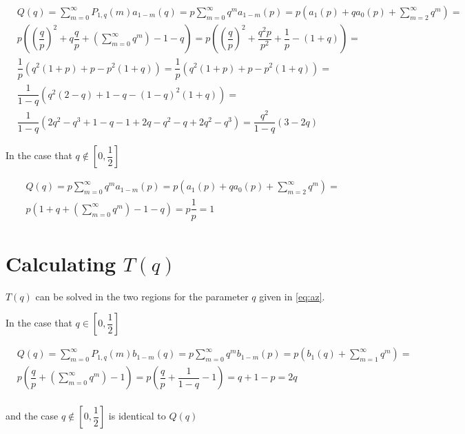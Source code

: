 \documentclass[letterpaper,12pt]{report}
\theoremstyle{plain}
\theoremstyle{definition}
\begin{document}
\begin{eqnarray}\label{eq:rpcalc}\nonumber
&\mathit{Q}(q)=\sum_{m=0}^{\infty}\mathit{P}_{1,q}(m)\mathit{a}_{1-m}(q)=p\sum_{m=0}^{\infty}q^m\mathit{a}_{1-m}(p)=p\left(
\mathit{a}_1(p)+q\mathit{a}_0(p)+\sum_{m=2}^{\infty}q^m
 \right)=\\\nonumber
 &p\left(
\left(\dfrac{q}{p}\right)^2+q\dfrac{q}{p}+\left(\sum_{m=0}^{\infty}q^m\right)-1-q
 \right) 
 =p\left(
\left(\dfrac{q}{p}\right)^2+\dfrac{q^2p}{p^2}+\dfrac{1}{p}-(1+q)
 \right)=\\\nonumber
&\dfrac{1}{p}\left(
q^2(1+p)+p-p^2(1+q)
\right) 
 =\dfrac{1}{p}
\left(q^2(1+p)+p-p^2(1+q)
 \right)=\\\nonumber
&\dfrac{1}{1-q}\left(
q^2(2-q)+1-q-(1-q)^2(1+q)
\right) 
 =\\\nonumber
 &\dfrac{1}{1-q}\left(
2q^2-q^3+1-q-1+2q-q^2 -q+2q^2-q^3
\right) = \dfrac{q^2}{1-q}\left(
3-2q
\right)
\end{eqnarray}

In the case  that $q\notin [0,\dfrac{1}{2}]$

\begin{eqnarray}\nonumber
&\mathit{Q}(q)=p\sum_{m=0}^{\infty}q^m\mathit{a}_{1-m}(p)=p\left(
\mathit{a}_1(p)+q\mathit{a}_0(p)+\sum_{m=2}^{\infty}q^m
 \right)=\\\nonumber
 &p
\left(1+q+\left(\sum_{m=0}^{\infty}q^m\right)-1-q
 \right) 
 =p\dfrac{1}{p}=1
\end{eqnarray}

\section{Calculating $\mathit{T}(q)$ } \label{app:calctofp} 

$\mathit{T}(q)$  can be solved in the two regions for the parameter $q$ given in \ref{eq:az}.

In the case  that $q\in [0,\dfrac{1}{2}]$

\begin{eqnarray}\label{eq:rpcalc}\nonumber
&\mathit{Q}(q)=\sum_{m=0}^{\infty}\mathit{P}_{1,q}(m)\mathit{b}_{1-m}(q)=p\sum_{m=0}^{\infty}q^m\mathit{b}_{1-m}(p)=p\left(
\mathit{b}_1(q)+\sum_{m=1}^{\infty}q^m
 \right)=\\\nonumber
 &p\left(
\dfrac{q}{p}+\left(\sum_{m=0}^{\infty}q^m\right)-1
 \right) 
 =p\left(
\dfrac{q}{p}+\dfrac{1}{1-q}-1
 \right)=q+1-p=2q\\\nonumber
\end{eqnarray}

and the case $q\notin [0,\dfrac{1}{2}]$ is identical to $\mathit{Q}(q)$
\end{document}
